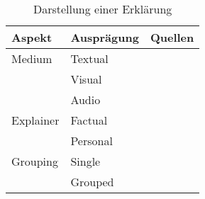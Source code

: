 \begin{table}
    \begin{center}
        \begin{tabular}{|p{}|p{}|p{}|}
            \hline
            \textbf{Aspekt}     & \textbf{Ausprägung} & \textbf{Quellen} \\ \hline
            Medium              & Textual  &    \cite{sokol_explainability_2020} \cite{balog_measuring_2020}
                                                \cite{tintarev_designing_nodate} \cite{sato_action-triggering_2019}
                                                \cite{eiband_impact_2019} \cite{eiband_impact_2019}
                                                \cite{abdulrahman_belief-based_2019} \cite{cassens_ambient_2019}
                                                \cite{nunes_systematic_2017} \\
                                & Visual    &   \cite{sokol_explainability_2020} \cite{sato_action-triggering_2019}
                                                \cite{sokol_explainability_2020}  \cite{mucha_interfaces_2021}
                                                \cite{abdulrahman_belief-based_2019} \cite{nunes_systematic_2017}
                                                \cite{schrills_color_2020} \\
                                & Audio     &   \cite{wiegand2019drive} \cite{nunes_systematic_2017} \cite{wang_is_2018} \\
            \hline
            Explainer           & Factual   &   \cite{eiband_impact_2019} \cite{abdulrahman_belief-based_2019}
                                                \cite{kunkel_let_2019} \cite{neerincx_using_2018} \\
                                & Personal  &   \cite{abdulrahman_belief-based_2019} \cite{kunkel_let_2019}
                                                \cite{weitz_you_2019} \cite{zahedi_towards_2019} \cite{neerincx_using_2018} \\
            \hline
            Grouping            & Single    &   \cite{nunes_systematic_2017} \cite{balog_measuring_2020}
                                                \cite{sato_action-triggering_2019} \cite{eiband_impact_2019}
                                                \cite{abdulrahman_belief-based_2019} \\
                                & Grouped   &   \cite{nunes_systematic_2017} \cite{balog_measuring_2020}
                                                \cite{tintarev_designing_nodate}  \\
            \hline
        \end{tabular}
    \end{center}
    \caption{Darstellung einer Erklärung}
    \label{tab:presentation_of_explanations}
\end{table}

\smallskip

\noindent{}

\smallskip